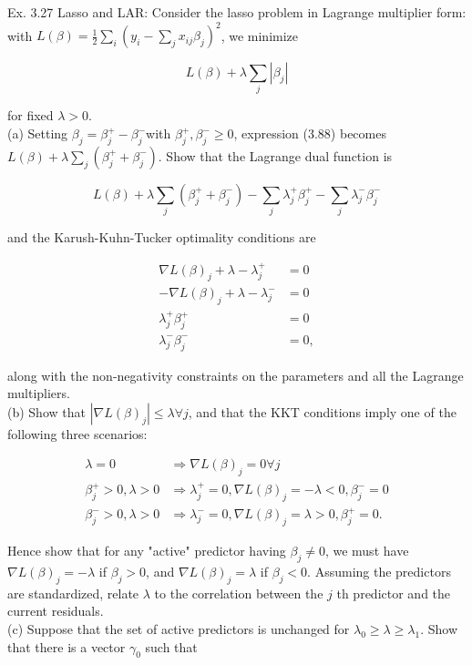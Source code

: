 \documentclass[10pt]{article}
\begin{document}
Ex. 3.27 Lasso and LAR: Consider the lasso problem in Lagrange multiplier form: with $L(\beta)=\frac{1}{2} \sum_{i}\left(y_{i}-\sum_{j} x_{i j} \beta_{j}\right)^{2}$, we minimize


\begin{equation*}
L(\beta)+\lambda \sum_{j}\left|\beta_{j}\right| \tag{3.88}
\end{equation*}


for fixed $\lambda>0$.\\
(a) Setting $\beta_{j}=\beta_{j}^{+}-\beta_{j}^{-}$with $\beta_{j}^{+}, \beta_{j}^{-} \geq 0$, expression (3.88) becomes $L(\beta)+\lambda \sum_{j}\left(\beta_{j}^{+}+\beta_{j}^{-}\right)$. Show that the Lagrange dual function is


\begin{equation*}
L(\beta)+\lambda \sum_{j}\left(\beta_{j}^{+}+\beta_{j}^{-}\right)-\sum_{j} \lambda_{j}^{+} \beta_{j}^{+}-\sum_{j} \lambda_{j}^{-} \beta_{j}^{-} \tag{3.89}
\end{equation*}


and the Karush-Kuhn-Tucker optimality conditions are

$$
\begin{aligned}
\nabla L(\beta)_{j}+\lambda-\lambda_{j}^{+} & =0 \\
-\nabla L(\beta)_{j}+\lambda-\lambda_{j}^{-} & =0 \\
\lambda_{j}^{+} \beta_{j}^{+} & =0 \\
\lambda_{j}^{-} \beta_{j}^{-} & =0,
\end{aligned}
$$

along with the non-negativity constraints on the parameters and all the Lagrange multipliers.\\
(b) Show that $\left|\nabla L(\beta)_{j}\right| \leq \lambda \forall j$, and that the KKT conditions imply one of the following three scenarios:

$$
\begin{aligned}
\lambda=0 & \Rightarrow \nabla L(\beta)_{j}=0 \forall j \\
\beta_{j}^{+}>0, \lambda>0 & \Rightarrow \lambda_{j}^{+}=0, \nabla L(\beta)_{j}=-\lambda<0, \beta_{j}^{-}=0 \\
\beta_{j}^{-}>0, \lambda>0 & \Rightarrow \lambda_{j}^{-}=0, \nabla L(\beta)_{j}=\lambda>0, \beta_{j}^{+}=0 .
\end{aligned}
$$

Hence show that for any "active" predictor having $\beta_{j} \neq 0$, we must have $\nabla L(\beta)_{j}=-\lambda$ if $\beta_{j}>0$, and $\nabla L(\beta)_{j}=\lambda$ if $\beta_{j}<0$. Assuming the predictors are standardized, relate $\lambda$ to the correlation between the $j$ th predictor and the current residuals.\\
(c) Suppose that the set of active predictors is unchanged for $\lambda_{0} \geq \lambda \geq \lambda_{1}$. Show that there is a vector $\gamma_{0}$ such that
\end{document}
